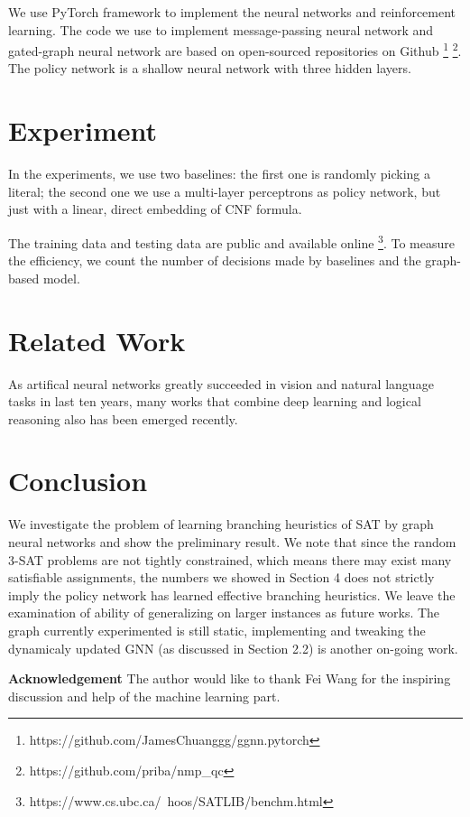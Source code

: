 \documentclass[sigplan,10pt]{acmart}\settopmatter{printfolios=true,printccs=false,printacmref=false}
\begin{document}
We use PyTorch framework to implement the neural networks and reinforcement learning.
The code we use to implement message-passing neural network and gated-graph neural network 
are based on open-sourced repositories on Github 
\footnote{https://github.com/JamesChuanggg/ggnn.pytorch} 
\footnote{https://github.com/priba/nmp\_qc}.
The policy network is a shallow neural network with three hidden layers.

\section{Experiment}

In the experiments, we use two baselines: the first one is randomly picking a literal; 
the second one we use a multi-layer perceptrons as policy network, but just with 
a linear, direct embedding of CNF formula.

The training data and testing data are public and available online 
\footnote{https://www.cs.ubc.ca/~hoos/SATLIB/benchm.html}.
To measure the efficiency, we count the number of decisions made by baselines and the 
graph-based model.

\section{Related Work}

As artifical neural networks greatly succeeded in vision and natural language tasks in last ten years,
many works that combine deep learning and logical reasoning also has been emerged recently.

\section{Conclusion}

We investigate the problem of learning branching heuristics of SAT by 
graph neural networks and show the preliminary result. 
We note that since the random 3-SAT problems are not tightly constrained,
which means there may exist many satisfiable assignments, the numbers we showed
in Section 4 does not strictly imply the policy network has learned effective
branching heuristics. We leave the examination of ability of generalizing
on larger instances as future works. The graph currently experimented is still 
static, implementing and tweaking the dynamicaly updated GNN (as discussed in 
Section 2.2) is another on-going work.

\textbf{Acknowledgement} The author would like to thank Fei Wang for the inspiring discussion and 
help of the machine learning part.
\end{document}
